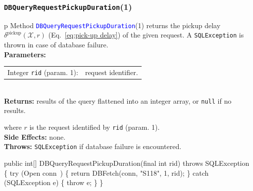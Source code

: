 \documentclass{article}
\def\nwendcode{\endtrivlist \endgroup}      %
\let\nwdocspar=\par
\theoremstyle{definition}                   %
\begin{document}
\subsubsection{{\tt{}\protect{}DBQueryRequestPickupDuration}(1)}
\begin{tabular}{p{\textwidth}}
\toprule
{}
Method \textcolor{blue}{{\tt{}\protect{}DBQueryRequestPickupDuration}}(1) returns the
pickup delay $\delta^\textrm{pickup}(\mathcal{X},r)$
(Eq.~\ref{eq:pick-up delay}) of the given request.
A {\tt{}SQLException} is thrown in case of database failure.\\
\midrule
\textbf{Parameters:}\\
\begin{tabular}{lp{116mm}}
Integer {\tt{}rid} (param. 1):&request identifier.
\end{tabular}\\
\textbf{Returns:} results of the query flattened into an integer array,
or {\tt{}null} if no results.


where $r$ is the request identified by {\tt{}rid} (param. 1).\\
\textbf{Side Effects:} none.\\
\textbf{Throws:} {\tt{}SQLException} if database failure is encountered.\\
\bottomrule
\end{tabular}
\nwenddocs{}\plusendmoddef
public int[] DBQueryRequestPickupDuration(final int rid) throws SQLException \{
  try (\LA{}Open \code{}conn\edoc{}~{\nwtagstyle{}}\RA{}) \{
    return DBFetch(conn, "S118", 1, rid);
  \} catch (SQLException e) \{
    throw e;
  \}
\}
\eatline
{}\nwendcode{}\nwdocspar
\end{document}
